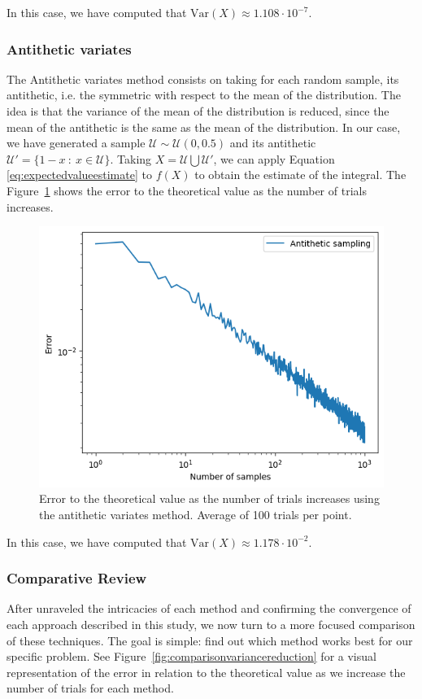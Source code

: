 \documentclass{article}
\begin{document}
In this case, we have computed that \(\mathrm{Var}(X) \approx 1.108 \cdot 10^{-7}\).

\subsubsection{Antithetic variates}
\label{sec:antithetic_variates}

The Antithetic variates method consists on taking for each random sample, its antithetic, i.e. the symmetric with respect to the mean of the distribution. The idea is that the variance of the mean of the distribution is reduced, since the mean of the antithetic is the same as the mean of the distribution. In our case, we have generated a sample \(\mathcal{U} \sim \mathcal{U}(0,0.5)\) and its antithetic \(\mathcal{U}' = \{1 - x \ : \ x \in \mathcal{U}\}\). Taking \(X = \mathcal{U} \bigcup \mathcal{U}' \), we can apply Equation \eqref{eq:expectedvalueestimate} to \(f(X)\) to obtain the estimate of the integral. The Figure~\ref{fig:antitheticvariates} shows the error to the theoretical value as the number of trials increases.

\begin{figure}[H]
	\centering
	\includegraphics[width=0.5\linewidth]{./Figures/VarianceReduction/antithetic.png}
	\caption{Error to the theoretical value as the number of trials increases using the antithetic variates method. Average of 100 trials per point.}
	\label{fig:antitheticvariates}
\end{figure}

In this case, we have computed that \(\mathrm{Var}(X) \approx 1.178 \cdot 10^{-2}\).

\subsubsection{Comparative Review}
\label{sec:comparative_review}

After unraveled the intricacies of each method and confirming the convergence of each approach described in this study, we now turn to a more focused comparison of these techniques. The goal is simple: find out which method works best for our specific problem. See Figure~\ref{fig:comparisonvariancereduction} for a visual representation of the error in relation to the theoretical value as we increase the number of trials for each method.
\end{document}
